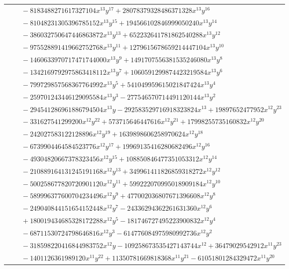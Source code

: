 \documentclass[11pt]{article}
\begin{document}
\begin{longtable}{@{}ll@{}}
 & $\quad -8183488271617327104x^{13}y^{17}+28078379328486371328x^{13}y^{16}$\\
 & $\quad -81048231305396785152x^{13}y^{15}+194566102846999050240x^{13}y^{14}$\\
 & $\quad -386032750647446863872x^{13}y^{13}+652232641781862540288x^{13}y^{12}$\\
 & $\quad -975528891419662752768x^{13}y^{11}+1279615678659214447104x^{13}y^{10}$\\
 & $\quad -1460633970717471744000x^{13}y^{9}+1491707556381535246080x^{13}y^{8}$\\
 & $\quad -1342169792975863418112x^{13}y^{7}+1060591299874423219584x^{13}y^{6}$\\
 & $\quad -799729857568367764992x^{13}y^{5}+541049959615021847424x^{13}y^{4}$\\
 & $\quad -259701243446129095584x^{13}y^{3}-277546570714491120144x^{13}y^{2}$\\
 & $\quad -294541286961886794504x^{13}y-292583529716918323824x^{13}+19897652477952x^{12}y^{23}$\\
 & $\quad -331627541299200x^{12}y^{22}+573715646447616x^{12}y^{21}+17998255735160832x^{12}y^{20}$\\
 & $\quad -242027583122128896x^{12}y^{19}+1639898606258970624x^{12}y^{18}$\\
 & $\quad -6739904464584523776x^{12}y^{17}+19969135416280682496x^{12}y^{16}$\\
 & $\quad -49304820667378323456x^{12}y^{15}+108850846477351053312x^{12}y^{14}$\\
 & $\quad -210889164131245191168x^{12}y^{13}+349961411826859318272x^{12}y^{12}$\\
 & $\quad -500258677820720901120x^{12}y^{11}+599222070995018909184x^{12}y^{10}$\\
 & $\quad -589996377600704234496x^{12}y^{9}+477002036807671396608x^{12}y^{8}$\\
 & $\quad -249040844151654152448x^{12}y^{7}-24336294362261631360x^{12}y^{6}$\\
 & $\quad +180019434685328172288x^{12}y^{5}-181746727495223900832x^{12}y^{4}$\\
 & $\quad -68711530724798646816x^{12}y^{3}-614776084975980992736x^{12}y^{2}$\\
 & $\quad -318598220416844983752x^{12}y-109258673535427143744x^{12}+36479029542912x^{11}y^{23}$\\
 & $\quad -1401126361989120x^{11}y^{22}+11350781669818368x^{11}y^{21}-61051801284329472x^{11}y^{20}$\\

\end{longtable}
\end{document}
